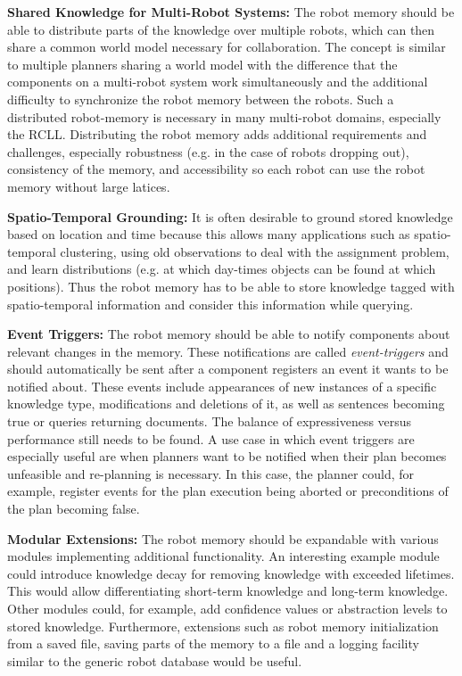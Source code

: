 \documentclass[a4paper,11pt]{article}
\begin{document}
\smallskip
\textbf{Shared Knowledge for Multi-Robot Systems:} The robot memory
should be able to distribute parts of the knowledge over multiple
robots, which can then share a common world model necessary for
collaboration. The concept is similar to multiple planners sharing a
world model with the difference that the components on a multi-robot
system work simultaneously and the additional difficulty to
synchronize the robot memory between the robots. Such a distributed
robot-memory is necessary in many multi-robot domains, especially the
RCLL.%
Distributing the robot memory adds
additional requirements and challenges, especially robustness (e.g. in
the case of robots dropping out), consistency of the memory, and
accessibility so each robot can use the robot memory without large
latices.

\smallskip
\textbf{Spatio-Temporal Grounding:} It is often desirable to ground
stored knowledge based on location and time because this allows many
applications such as spatio-temporal clustering, using old
observations to deal with the assignment problem, and learn
distributions (e.g. at which day-times objects can be found at which
positions). Thus the robot memory has to be able to store knowledge
tagged with spatio-temporal information and consider this information
while querying.

\smallskip
\textbf{Event Triggers:} The robot memory should be able to notify
components about relevant  changes in the memory.
These notifications are called \emph{event-triggers} and should
automatically be sent after a component registers an event it wants to
be notified about. These events include appearances of new instances
of a specific knowledge type, modifications and deletions of it, as
well as sentences becoming true or queries returning documents. The
balance of expressiveness versus performance still needs to be
found. A use case in which event triggers are especially useful are
when planners want to be notified when their plan becomes unfeasible
and re-planning is necessary. In this case, the planner could, for
example, register events for the plan execution being aborted or
preconditions of the plan becoming false.

\smallskip
\textbf{Modular Extensions:} The robot memory should be expandable
with various modules implementing additional functionality. An
interesting example module could introduce knowledge decay for
removing knowledge with exceeded lifetimes. This would allow
differentiating short-term knowledge and long-term knowledge. Other
modules could, for example, add confidence values or abstraction
levels to stored knowledge. Furthermore, extensions such as robot
memory initialization from a saved file, saving parts of the memory to
a file and a logging facility similar to the generic robot database
would be useful.
\end{document}
